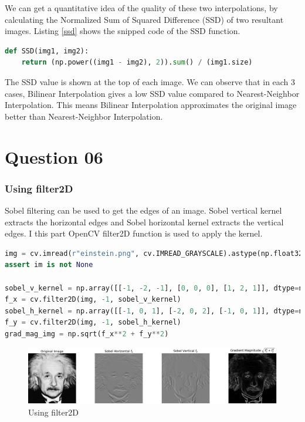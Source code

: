 \documentclass[a4paper]{article}
\begin{document}
We can get a quantitative idea of the quality of these two interpolations,
 by calculating the Normalized Sum of Squared Difference (SSD) of two
  resultant images. Listing \ref{ssd} shows the snipped code of the SSD
   function.
\begin{lstlisting}[language=python, caption=SSD, label=ssd]
def SSD(img1, img2):
    return (np.power((img1 - img2), 2)).sum() / (img1.size)
\end{lstlisting}
The SSD value is shown at the top of each image. We can observe that
 in each 3 cases, Bilinear Interpolation gives a low SSD value compared
  to Nearest-Neighbor Interpolation. This means Bilinear Interpolation
   approximates the original image better than Nearest-Neighbor
    Interpolation.



\section*{Question 06}
\subsubsection*{Using filter2D}
Sobel filtering can be used to get the edges of an image. Sobel
 vertical kernel extracts the horizontal edges and Sobel horizontal
  kernel extracts the vertical edges. I this part OpenCV filter2D
   function is used to apply the kernel.
\begin{lstlisting}[language=python]
img = cv.imread(r"einstein.png", cv.IMREAD_GRAYSCALE).astype(np.float32)
assert im is not None

sobel_v_kernel = np.array([[-1, -2, -1], [0, 0, 0], [1, 2, 1]], dtype=np.float32)
f_x = cv.filter2D(img, -1, sobel_v_kernel)
sobel_h_kernel = np.array([[-1, 0, 1], [-2, 0, 2], [-1, 0, 1]], dtype=np.float32)
f_y = cv.filter2D(img, -1, sobel_h_kernel)
grad_mag_img = np.sqrt(f_x**2 + f_y**2)
\end{lstlisting}
\begin{figure}[!htb]
    \centering
    \includegraphics[width=\textwidth]{../q61.png}
    \caption{Using filter2D}
    \label{fig61}
\end{figure}
\end{document}

